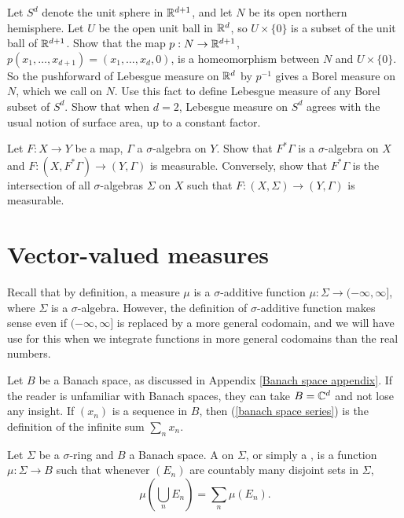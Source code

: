 \begin{exercise}
\label{Lebesgue measure on sphere}
Let $S^d$ denote the unit sphere in $\mathbb{R}^{d+1}$, and let $N$ be its open northern hemisphere.
Let $U$ be the open unit ball in $\mathbb{R}^d$, so $U \times \{0\}$ is a subset of the unit ball of $\mathbb{R}^{d+1}$.
Show that the map $p: N \to \mathbb{R}^{d+1}$, $p(x_1, \dots, x_{d+1}) = (x_1, \dots, x_d, 0)$, is a homeomorphism between $N$ and $U \times \{0\}$.
So the pushforward of Lebesgue measure on $\mathbb{R}^d$ by $p^{-1}$ gives a Borel measure on $N$, which we call  on $N$.
Use this fact to define Lebesgue measure of any Borel subset of $S^d$.
Show that when $d = 2$, Lebesgue measure on $S^d$ agrees with the usual notion of surface area, up to a constant factor.
\end{exercise}

\begin{exercise}
\label{pullback makes sense}
Let $F: X \to Y$ be a map, $\Gamma$ a $\sigma$-algebra on $Y$.
Show that $F^*\Gamma$ is a $\sigma$-algebra on $X$ and $F: (X, F^*\Gamma) \to (Y, \Gamma)$ is measurable.
Conversely, show that $F^*\Gamma$ is the intersection of all $\sigma$-algebras $\Sigma$ on $X$ such that $F: (X, \Sigma) \to (Y, \Gamma)$ is measurable.
\end{exercise}

\section{Vector-valued measures}
Recall that by definition, a measure $\mu$ is a $\sigma$-additive function $\mu: \Sigma \to (-\infty, \infty]$, where $\Sigma$ is a $\sigma$-algebra.
However, the definition of $\sigma$-additive function makes sense even if $(-\infty, \infty]$ is replaced by a more general codomain, and we will have use for this when we integrate functions in more general codomains than the real numbers.

\begin{subsec}
Let $B$ be a Banach space, as discussed in Appendix \ref{Banach space appendix}.
If the reader is unfamiliar with Banach spaces, they can take $B = \mathbb{C}^d$ and not lose any insight.
If $(x_n)$ is a sequence in $B$, then (\ref{banach space series}) is the definition of the infinite sum $\sum_n x_n$.
\end{subsec}

\begin{definition}
Let $\Sigma$ be a $\sigma$-ring and $B$ a Banach space.
A  on $\Sigma$, or simply a , is a function $\mu: \Sigma \to B$ such that whenever $(E_n)$ are countably many disjoint sets in $\Sigma$,
$$\mu\left(\bigcup_n E_n\right) = \sum_n \mu(E_n).$$
\end{definition}

